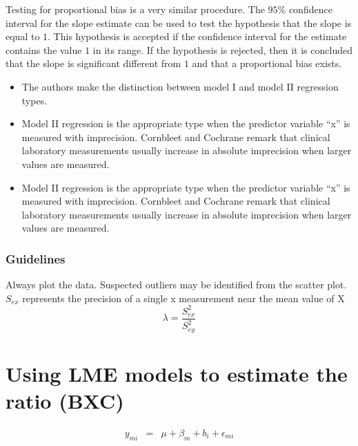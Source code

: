 \documentclass[12pt, a4paper]{report}
\theoremstyle{plain}
\theoremstyle{definition}
\theoremstyle{remark}
\begin{document}
Testing for proportional bias is a very similar procedure. The $95\%$ confidence interval for the slope estimate can be used to
test the hypothesis that the slope is equal to $1$. This hypothesis is accepted if the confidence interval for the estimate
contains the value $1$ in its range. If the hypothesis is rejected, then it is concluded that the slope is significant
different from $1$ and that a proportional bias exists.

\begin{itemize}
\item The authors make the distinction between model I and model II regression types.
	\item Model II regression is the appropriate type when the predictor variable “x” is measured with imprecision.
	Cornbleet and Cochrane remark that clinical laboratory measurements usually increase in absolute imprecision when larger values are measured. %
\end{itemize}

\begin{itemize}
\item Model II regression is the appropriate type when the predictor variable “x” is measured with imprecision.
	Cornbleet and Cochrane remark that clinical laboratory measurements usually increase in absolute imprecision when larger values are measured. %
\end{itemize}

\subsubsection*{Guidelines}
Always plot the data. Suspected outliers may be identified from the scatter plot.
$S_{ex}$  represents the precision of a single x measurement near the mean value of X
\[\lambda = \frac{S^2_{ex}}{S^2_{ey}}\]






\section{Using LME models to estimate the ratio (BXC) }

\begin{eqnarray*}
	y_{mi} &=& \mu + \beta_{m} + b_{i} + \epsilon_{mi}\\
\end{eqnarray*}
\end{document}
